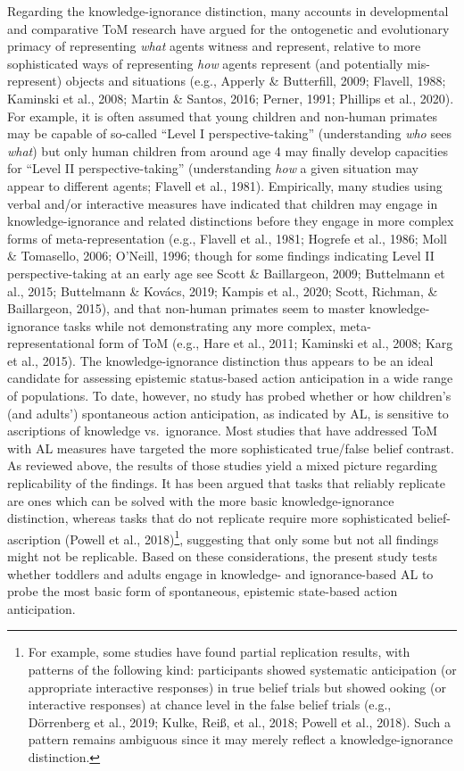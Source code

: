 \documentclass[
  english,
  man,floatsintext]{apa6}
\begin{document}
Regarding the knowledge-ignorance distinction, many accounts in developmental and comparative ToM research have argued for the ontogenetic and evolutionary primacy of representing \emph{what} agents witness and represent, relative to more sophisticated ways of representing \emph{how} agents represent (and potentially mis-represent) objects and situations (e.g., Apperly \& Butterfill, 2009; Flavell, 1988; Kaminski et al., 2008; Martin \& Santos, 2016; Perner, 1991; Phillips et al., 2020). For example, it is often assumed that young children and non-human primates may be capable of so-called ``Level I perspective-taking'' (understanding \emph{who} sees \emph{what}) but only human children from around age 4 may finally develop capacities for ``Level II perspective-taking'' (understanding \emph{how} a given situation may appear to different agents; Flavell et al., 1981). Empirically, many studies using verbal and/or interactive measures have indicated that children may engage in knowledge-ignorance and related distinctions before they engage in more complex forms of meta-representation (e.g., Flavell et al., 1981; Hogrefe et al., 1986; Moll \& Tomasello, 2006; O'Neill, 1996; though for some findings indicating Level II perspective-taking at an early age see Scott \& Baillargeon, 2009; Buttelmann et al., 2015; Buttelmann \& Kovács, 2019; Kampis et al., 2020; Scott, Richman, \& Baillargeon, 2015), and that non-human primates seem to master knowledge-ignorance tasks while not demonstrating any more complex, meta-representational form of ToM (e.g., Hare et al., 2011; Kaminski et al., 2008; Karg et al., 2015). The knowledge-ignorance distinction thus appears to be an ideal candidate for assessing epistemic status-based action anticipation in a wide range of populations.
To date, however, no study has probed whether or how children's (and adults') spontaneous action anticipation, as indicated by AL, is sensitive to ascriptions of knowledge vs.~ignorance. Most studies that have addressed ToM with AL measures have targeted the more sophisticated true/false belief contrast. As reviewed above, the results of those studies yield a mixed picture regarding replicability of the findings. It has been argued that tasks that reliably replicate are ones which can be solved with the more basic knowledge-ignorance distinction, whereas tasks that do not replicate require more sophisticated belief-ascription (Powell et al., 2018)\footnote{For example, some studies have found partial replication results, with patterns of the following kind: participants showed systematic anticipation (or appropriate interactive responses) in true belief trials but showed ooking (or interactive responses) at chance level in the false belief trials (e.g., Dörrenberg et al., 2019; Kulke, Reiß, et al., 2018; Powell et al., 2018). Such a pattern remains ambiguous since it may merely reflect a knowledge-ignorance distinction.}, suggesting that only some but not all findings might not be replicable. Based on these considerations, the present study tests whether toddlers and adults engage in knowledge- and ignorance-based AL to probe the most basic form of spontaneous, epistemic state-based action anticipation.
\end{document}
